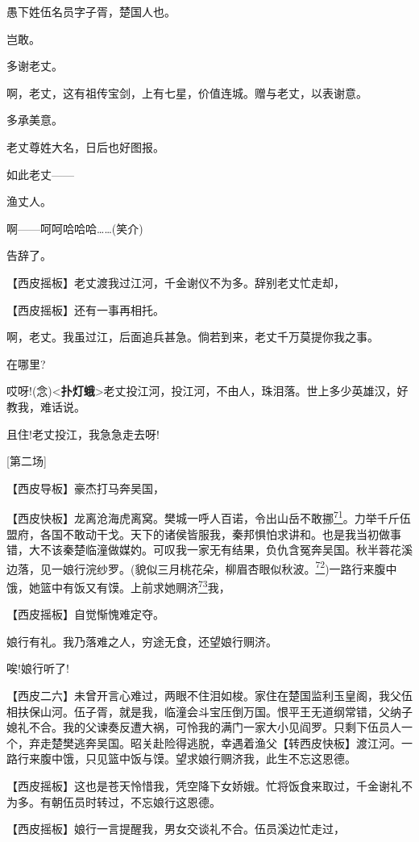 愚下姓伍名员字子胥，楚国人也。

岂敢。

多谢老丈。

啊，老丈，这有祖传宝剑，上有七星，价值连城。赠与老丈，以表谢意。

多承美意。

老丈尊姓大名，日后也好图报。

如此老丈------

渔丈人。

啊------呵呵哈哈哈\ldots{}\ldots{}(笑介)

告辞了。

【西皮摇板】老丈渡我过江河，千金谢仪不为多。辞别老丈忙走却，

【西皮摇板】还有一事再相托。

啊，老丈。我虽过江，后面追兵甚急。倘若到来，老丈千万莫提你我之事。

在哪里?

哎呀!(念)\textless{}\textbf{扑灯蛾}\textgreater{}老丈投江河，投江河，不由人，珠泪落。世上多少英雄汉，好教我，难话说。

且住!老丈投江，我急急走去呀!

{[}第二场{]}

【西皮导板】豪杰打马奔吴国，

【西皮快板】龙离沧海虎离窝。樊城一呼人百诺，令出山岳不敢挪\protect\hyperlink{fn71}{\textsuperscript{71}}。力举千斤伍盟府，各国不敢动干戈。天下的诸侯皆服我，秦邦惧怕求讲和。也是我当初做事错，大不该秦楚临潼做媒妁。可叹我一家无有结果，负仇含冤奔吴国。秋半蓉花溪边落，见一娘行浣纱罗。(貌似三月桃花朵，柳眉杏眼似秋波。\protect\hyperlink{fn72}{\textsuperscript{72}})一路行来腹中饿，她篮中有饭又有馍。上前求她赒济\protect\hyperlink{fn73}{\textsuperscript{73}}我，

【西皮摇板】自觉惭愧难定夺。

娘行有礼。我乃落难之人，穷途无食，还望娘行赒济。

唉!娘行听了!

【西皮二六】未曾开言心难过，两眼不住泪如梭。家住在楚国监利玉皇阁，我父伍相扶保山河。伍子胥，就是我，临潼会斗宝压倒万国。恨平王无道纲常错，父纳子媳礼不合。我的父谏奏反遭大祸，可怜我的满门一家大小见阎罗。只剩下伍员人一个，弃走楚樊逃奔吴国。昭关赴险得逃脱，幸遇着渔父【转西皮快板】渡江河。一路行来腹中饿，只见篮中饭与馍。望求娘行赒济我，此生不忘这恩德。

【西皮摇板】这也是苍天怜惜我，凭空降下女娇娥。忙将饭食来取过，千金谢礼不为多。有朝伍员时转过，不忘娘行这恩德。

【西皮摇板】娘行一言提醒我，男女交谈礼不合。伍员溪边忙走过，

